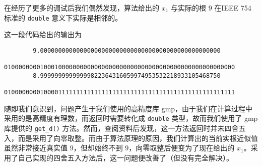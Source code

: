 	在经历了更多的调试后我们偶然发现，算法给出的 $x_1$ 与实际的根 $9$ 在IEEE 754标准的 \verb|double| 意义下实际是相邻的。
	
	\begin{myverbatim}
		
	\end{myverbatim}
	
	这一段代码给出的输出为
	
	\begin{verbatim}
		9.00000000000000000000000000000000000000000000000000
		0100000000100010000000000000000000000000000000000000000000000000
		8.99999999999999822364316059974953532218933105468750
		0100000000100001111111111111111111111111111111111111111111111111
	\end{verbatim}
	
	随即我们意识到，问题产生于我们使用的高精度库 gmp，由于我们在计算过程中采用的是高精度有理数，而返回时需要转化成 \verb|double| 类型，故而我们使用了 gmp 库提供的 \verb|get_d()| 方法。然而，查阅资料后发现，这一方法返回时并未四舍五入，而是采用了向零取整。而由于算法原理的原因，我们计算出的当前实根近似值虽然非常接近真实值 $9$，但却始终不到 $9$，向零取整后便变为了现在给出的 $x_1$。采用了自己实现的四舍五入方法后，这一问题便改善了（但没有完全解决）。